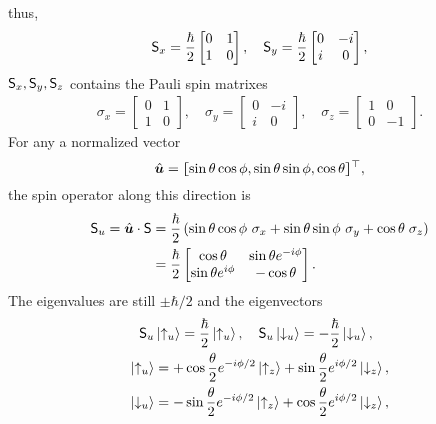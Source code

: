 \documentclass{article}
\def\u{\uparrow}\def\v{\downarrow}
\newcommand{\ko}[1]{\hspace{-#1 pt}}%
\newcommand{\ket}[1]{\left\vert #1\right\rangle}
\newcommand{\kh}[1]{\left(#1\right)}
\newcommand{\cmm}[1]{\lfloor\ko{4.45}\lceil #1\rceil\ko{4.45}\rfloor}%
\begin{document}
thus,
\begin{align*}
	\mathsf S_x=\frac{\hbar}2\begin{bmatrix}0&1\\1&0\end{bmatrix},\quad
	\mathsf S_y=\frac{\hbar}2\begin{bmatrix}0&-i\\i&0\end{bmatrix},
\end{align*}
$\mathsf S_x,\mathsf S_y,\mathsf S_z$ contains the Pauli spin matrixes
\begin{align*}
	\sigma_x=\begin{bmatrix}0&1\\1&0\end{bmatrix},\quad
	\sigma_y=\begin{bmatrix}0&-i\\i&0\end{bmatrix},\quad
	\sigma_z=\begin{bmatrix}1&0\\0&-1\end{bmatrix}.
\end{align*}
For any a normalized vector
$$\hat{\bm u}=\cmm{\sin\theta\cos\phi,\sin\theta\sin\phi,\cos\theta}^\top,$$
the spin operator along this direction is
\begin{align*}
	\sS_u=\hat{\bm u}\cdot\sS & =\frac{\hbar}2\kh{\sin\theta\cos\phi~\sigma_x+\sin\theta\sin\phi~\sigma_y+\cos\theta\;\sigma_z} \\
	                          & =\frac{\hbar}2\begin{bmatrix}\cos\theta&\sin\theta e^{-i\phi}\\\sin\theta e^{i\phi}&-\cos\theta\end{bmatrix}.
\end{align*}
The eigenvalues are still $\pm\hbar/2$ and the eigenvectors
\begin{align*}
	\sS_u      & \ket{\u_u}=\frac{\hbar}2\ket{\u_u},\quad\sS_u\ket{\v_u}=-\frac{\hbar}2\ket{\v_u},   \\
	\ket{\u_u} & =+\cos\frac{\theta}2e^{-i\phi/2}\ket{\u_z}+\sin\frac{\theta}2e^{i\phi/2}\ket{\v_z}, \\
	\ket{\v_u} & =-\sin\frac{\theta}2e^{-i\phi/2}\ket{\u_z}+\cos\frac{\theta}2e^{i\phi/2}\ket{\v_z},
\end{align*}
\end{document}
